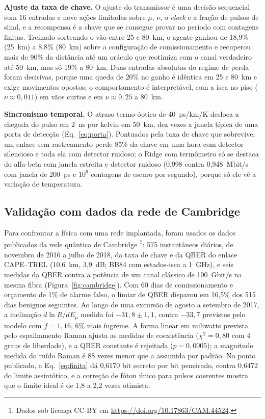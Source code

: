 \documentclass[12pt]{article}
\begin{document}
\label{sec:taxa}
\textbf{Ajuste da taxa de chave.} O ajuste do transmissor é uma decisão
sequencial com 16 entradas e nove ações limitadas sobre $\mu$, $\nu$, o
\textit{clock} e a fração de pulsos de sinal, e a recompensa é a chave que se
consegue provar no período com contagens finitas. Treinado sorteando o vão entre
25 e 80~km, o agente ganhou de 18,9\% (25~km) a 8,8\% (80~km) sobre a
configuração de comissionamento e recuperou mais de 90\% da distância até um
oráculo que reotimiza com o canal verdadeiro até 50~km, mas só 19\% a 80~km. Duas
entradas absolutas do regime de perda foram decisivas, porque uma queda de 20\%
no ganho é idêntica em 25 e 80~km e exige movimentos opostos; o comportamento é
interpretável, com a isca no piso ($\nu\approx0{,}011$) em vãos curtos e em
$\nu\approx0{,}25$ a 80~km.

\label{sec:sincronismo}
\textbf{Sincronismo temporal.} O atraso termo-óptico de 40~ps/km/K desloca a
chegada do pulso em 2~ns por kelvin em 50~km, dez vezes a janela típica de uma
porta de detecção (Eq.~\ref{eq:porta}). Pontuados pela taxa de chave que
sobrevive, um enlace sem rastreamento perde 85\% da chave em uma hora com
detector silencioso e toda ela com detector ruidoso; o Ridge com termômetro só se
destaca do alfa-beta com janela estreita e detector ruidoso (0,998 contra
0,948~Mbit/s com janela de 200~ps e $10^6$ contagens de escuro por segundo),
porque só ele vê a variação de temperatura.

\subsection{Validação com dados da rede de Cambridge}
\label{sec:cambridge}

Para confrontar a física com uma rede implantada, foram usados os dados
publicados da rede quântica de Cambridge \cite{dynes2019}\footnote{Dados sob
licença CC-BY em \url{https://doi.org/10.17863/CAM.44524}.}: 575 instantâneos
diários, de novembro de 2016 a julho de 2018, da taxa de chave e da QBER do
enlace CAPE--TREL (10,6~km, 3,9~dB; BB84 com estados-isca a 1~GHz), e seis medidas
da QBER contra a potência de um canal clássico de 100~Gbit/s na mesma fibra
(Figura~\ref{fig:cambridge}). Com 60 dias de comissionamento e orçamento de 1\%
de alarme falso, o limiar de QBER disparou em 16,5\% dos 515 dias benignos
seguintes. Ao longo de uma excursão de agosto a setembro de 2017, a inclinação
$d\ln R/dE_\mu$ medida foi $-31{,}8\pm1{,}1$, contra $-33{,}7$ previstos pelo modelo
com $f=1{,}16$, 6\% mais íngreme. A forma linear em miliwatts prevista pelo
espalhamento Raman ajusta as medidas de coexistência ($\chi^2=0{,}80$ com 4 graus
de liberdade), e a QBER constante é rejeitada ($p=0{,}0005$); a magnitude medida
do ruído Raman é 88 vezes menor que a assumida por padrão. No ponto publicado, a Eq.~\ref{eq:finita}
dá 0,6170 bit secreto por bit peneirado, contra 0,6472 do limite assintótico, e
a correção de fóton único para pulsos coerentes mostra que o limite ideal é de
1,8 a 2,2 vezes otimista.
\end{document}
